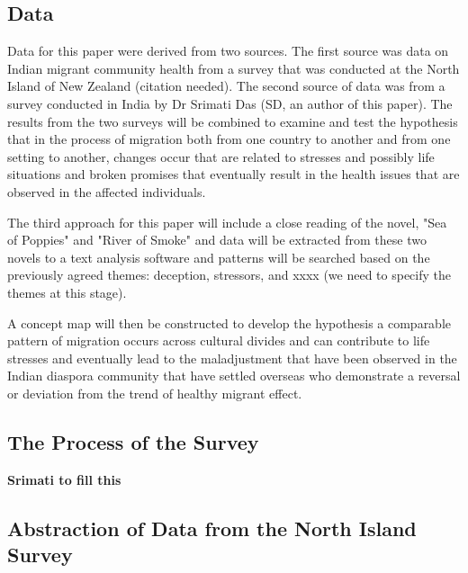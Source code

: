 \subsection{Data}

Data for this paper were derived from two sources. The first source was data on Indian migrant community health from a survey that was conducted at the North Island of New Zealand (citation needed). The second source of data was from a survey conducted in India by Dr Srimati Das (SD, an author of this paper). The results from the two surveys will be combined to examine and test the hypothesis that in the process of migration both from one country to another and from one setting to another, changes occur that are related to stresses and possibly life situations and broken promises that eventually result in the health issues that are observed in the affected individuals.

The third approach for this paper will include a close reading of the novel, "Sea of Poppies" and "River of Smoke" and data will be extracted from these two novels to a text analysis software and patterns will be searched based on the previously agreed themes: deception, stressors, and xxxx (we need to specify the themes at this stage).

A concept map will then be constructed to develop the hypothesis a comparable pattern of migration occurs across cultural divides and can contribute to life stresses and eventually lead to the maladjustment that have been observed in the Indian diaspora community that have settled overseas who demonstrate a reversal or deviation from the trend of healthy migrant effect. 

\subsection{The Process of the Survey}
\textbf{Srimati to fill this}

\subsection{Abstraction of Data from the North Island Survey}


